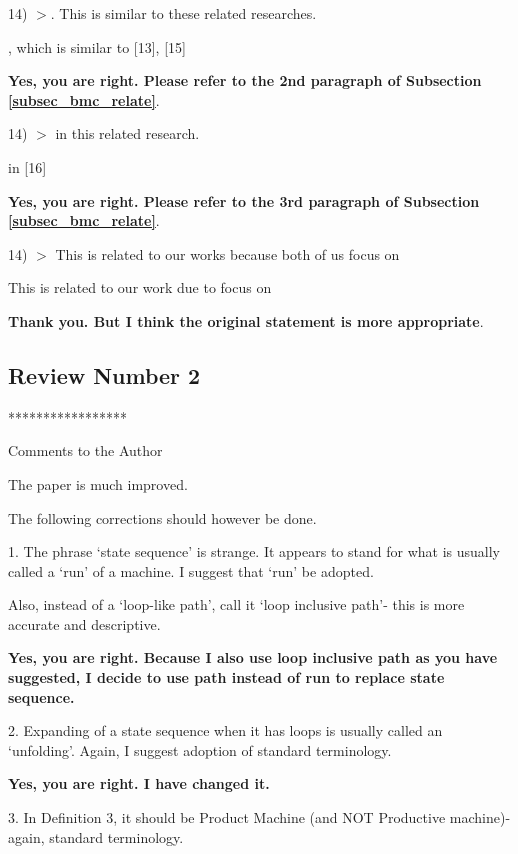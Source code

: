 \documentclass[journal]{IEEEtran}
\begin{document}
{\bigskip

14) $>$. This is similar to these related researches.

  , which is similar to [13], [15]

\smallskip
\textbf{Yes,
you are right.
Please refer to the 2nd paragraph of Subsection \ref{subsec_bmc_relate}}.

\bigskip

14) $>$ in this related research.

  in [16]

\smallskip
\textbf{Yes,
you are right.
Please refer to the 3rd paragraph of Subsection \ref{subsec_bmc_relate}}.

\bigskip

14) $>$ This is related to our works because both of us focus on

   This is related to our work due to focus on

\smallskip
\textbf{Thank you.
But I think the original statement is more appropriate}.

\bigskip

\subsection{Review Number 2}
*****************

Comments to the Author

The paper is much improved.

The following corrections should however be done.

1. The phrase `state sequence' is strange. It appears to stand for what is usually called a `run' of a machine. I suggest that `run' be adopted.

Also, instead of a `loop-like path', call it `loop inclusive path'- this is more accurate and descriptive.

\smallskip
\textbf{Yes,
you are right.
Because I also use loop inclusive path as you have suggested,
I decide to use path instead of run to replace state sequence.}

\bigskip

2. Expanding of a state sequence when it has loops is usually called an `unfolding'. Again, I suggest adoption of standard terminology.

\smallskip
\textbf{Yes,
you are right.
I have changed it.}

\bigskip

3. In Definition 3, it should be Product Machine (and NOT Productive machine)- again, standard terminology.

}
\end{document}
